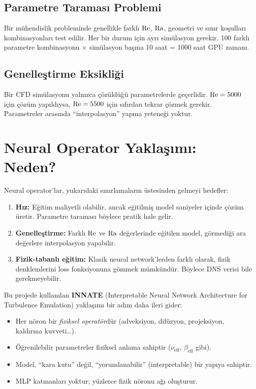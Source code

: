 \subsection{Parametre Taraması Problemi}
Bir mühendislik probleminde genellikle farklı $\mathrm{Re}$, $\mathrm{Ra}$, geometri ve sınır koşulları kombinasyonları test edilir. Her bir durum için ayrı simülasyon gerekir. 100 farklı parametre kombinasyonu $\times$ simülasyon başına 10 saat = 1000 saat GPU zamanı.

\subsection{Genelleştirme Eksikliği}
Bir CFD simülasyonu yalnızca çözüldüğü parametrelerde geçerlidir. $\mathrm{Re} = 5000$ için çözüm yapıldıysa, $\mathrm{Re} = 5500$ için sıfırdan tekrar çözmek gerekir. Parametreler arasında ``interpolasyon'' yapma yeteneği yoktur.


\section{Neural Operator Yaklaşımı: Neden?}
\label{sec:neden_neural}

Neural operator'lar, yukarıdaki sınırlamaların üstesinden gelmeyi hedefler:

\begin{enumerate}
    \item \textbf{Hız:} Eğitim maliyetli olabilir, ancak eğitilmiş model saniyeler içinde çözüm üretir. Parametre taraması böylece pratik hale gelir.

    \item \textbf{Genelleştirme:} Farklı $\mathrm{Re}$ ve $\mathrm{Ra}$ değerlerinde eğitilen model, görmediği ara değerlere interpolasyon yapabilir.

    \item \textbf{Fizik-tabanlı eğitim:} Klasik neural network'lerden farklı olarak, fizik denklemlerini loss fonksiyonuna gömmek mümkündür. Böylece DNS verisi bile gerekmeyebilir.
\end{enumerate}

Bu projede kullanılan \textbf{INNATE} (Interpretable Neural Network Architecture for Turbulence Emulation) yaklaşımı bir adım daha ileri gider:
\begin{itemize}
    \item Her nöron bir \textit{fiziksel operatör}dür (adveksiyon, difüzyon, projeksiyon, kaldırma kuvveti\ldots).
    \item Öğrenilebilir parametreler fiziksel anlama sahiptir ($\nu_{\text{eff}}$, $\beta_{\text{eff}}$ gibi).
    \item Model, ``kara kutu'' değil, ``yorumlanabilir'' (interpretable) bir yapıya sahiptir.
    \item MLP katmanları yoktur; yüzlerce fizik nöronu ağı oluşturur.
\end{itemize}


